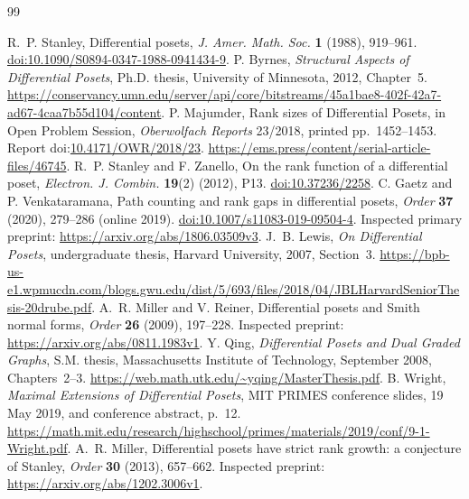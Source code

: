 \documentclass[11pt]{article}
\theoremstyle{remark}
\begin{document}
\newpage
\begin{thebibliography}{99}\small\raggedright
{} R.~P. Stanley, Differential posets, \emph{J. Amer. Math.
Soc.} \textbf{1} (1988), 919--961.
\href{https://doi.org/10.1090/S0894-0347-1988-0941434-9}{doi:10.1090/S0894-0347-1988-0941434-9}.
 P. Byrnes, \emph{Structural Aspects of Differential Posets},
Ph.D. thesis, University of Minnesota, 2012, Chapter~5.
\url{https://conservancy.umn.edu/server/api/core/bitstreams/45a1bae8-402f-42a7-ad67-4caa7b55d104/content}.
 P. Majumder, Rank sizes of Differential Posets, in
Open Problem Session, \emph{Oberwolfach Reports} 23/2018, printed pp.~1452--1453.
Report doi:\href{https://doi.org/10.4171/OWR/2018/23}{10.4171/OWR/2018/23}.
\url{https://ems.press/content/serial-article-files/46745}.
 R.~P. Stanley and F. Zanello, On the rank function of a
differential poset, \emph{Electron. J. Combin.} \textbf{19}(2) (2012), P13.
\href{https://doi.org/10.37236/2258}{doi:10.37236/2258}.
 C. Gaetz and P. Venkataramana, Path counting and rank gaps in
differential posets, \emph{Order} \textbf{37} (2020), 279--286 (online 2019).
\href{https://doi.org/10.1007/s11083-019-09504-4}{doi:10.1007/s11083-019-09504-4}.
Inspected primary preprint: \url{https://arxiv.org/abs/1806.03509v3}.
 J.~B. Lewis, \emph{On Differential Posets}, undergraduate thesis,
Harvard University, 2007, Section~3.
\url{https://bpb-us-e1.wpmucdn.com/blogs.gwu.edu/dist/5/693/files/2018/04/JBLHarvardSeniorThesis-20drube.pdf}.
 A.~R. Miller and V. Reiner, Differential posets and Smith normal
forms, \emph{Order} \textbf{26} (2009), 197--228.
Inspected preprint: \url{https://arxiv.org/abs/0811.1983v1}.
 Y. Qing, \emph{Differential Posets and Dual Graded Graphs}, S.M. thesis, Massachusetts
Institute of Technology, September 2008, Chapters~2--3.
\url{https://web.math.utk.edu/~yqing/MasterThesis.pdf}.
 B. Wright, \emph{Maximal Extensions of Differential Posets}, MIT PRIMES conference
slides, 19 May 2019, and conference abstract, p.~12.
\url{https://math.mit.edu/research/highschool/primes/materials/2019/conf/9-1-Wright.pdf}.
 A.~R. Miller, Differential posets have strict rank growth:
a conjecture of Stanley, \emph{Order} \textbf{30} (2013), 657--662.
Inspected preprint: \url{https://arxiv.org/abs/1202.3006v1}.
\end{thebibliography}
\end{document}
